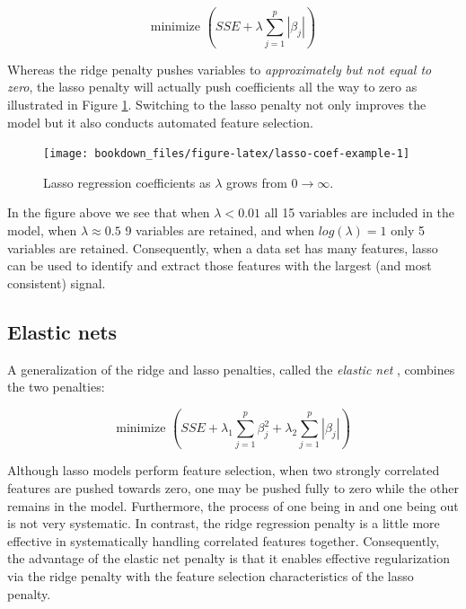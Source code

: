 \documentclass[]{krantz}
\begin{document}
\begin{equation}
\label{eq:lasso-penalty}
\text{minimize } \left( SSE + \lambda \sum^p_{j=1} | \beta_j | \right)
\end{equation}

Whereas the ridge penalty pushes variables to \emph{approximately but not equal to zero}, the lasso penalty will actually push coefficients all the way to zero as illustrated in Figure \ref{fig:lasso-coef-example}. Switching to the lasso penalty not only improves the model but it also conducts automated feature selection.

\begin{figure}

{\centering \texttt{[image: bookdown\_files/figure-latex/lasso-coef-example-1]} 

}

\caption{Lasso regression coefficients as $\lambda$ grows from  $0 \rightarrow \infty$.}\label{fig:lasso-coef-example}
\end{figure}

In the figure above we see that when \(\lambda < 0.01\) all 15 variables are included in the model, when \(\lambda \approx 0.5\) 9 variables are retained, and when \(log\left(\lambda\right) = 1\) only 5 variables are retained. Consequently, when a data set has many features, lasso can be used to identify and extract those features with the largest (and most consistent) signal.

\hypertarget{elastic}{%
\subsection{Elastic nets}\label{elastic}}

A generalization of the ridge and lasso penalties, called the \emph{elastic net} \citep{zou2005regularization}, combines the two penalties:

\begin{equation}
\label{eq:elastic-penalty}
\text{minimize } \left( SSE + \lambda_1 \sum^p_{j=1} \beta_j^2 + \lambda_2 \sum^p_{j=1} | \beta_j | \right)
\end{equation}

Although lasso models perform feature selection, when two strongly correlated features are pushed towards zero, one may be pushed fully to zero while the other remains in the model. Furthermore, the process of one being in and one being out is not very systematic. In contrast, the ridge regression penalty is a little more effective in systematically handling correlated features together. Consequently, the advantage of the elastic net penalty is that it enables effective regularization via the ridge penalty with the feature selection characteristics of the lasso penalty.
\end{document}
